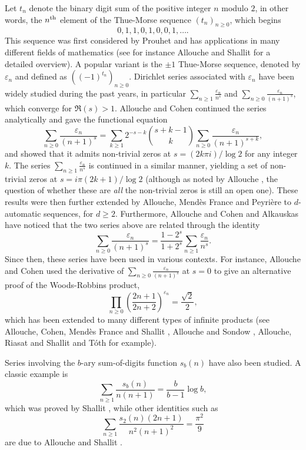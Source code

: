 \documentclass[12pt,reqno]{article}
\begin{document}
Let $t_n$ denote the binary digit sum of the positive integer $n$ modulo $2$, in other words, the $n^{\rm th}$ element of the Thue-Morse sequence $(t_n)_{n\geq0}$, which begins
$$
0,1,1,0,1,0,0,1,\ldots.
$$
This sequence was first considered by Prouhet \cite{Prouhet51} and has applications in many different fields of mathematics (see for instance Allouche and Shallit \cite{AlloucheShallit99} for a detailed overview). A popular variant is the $\pm1$ Thue-Morse sequence, denoted by $\varepsilon_n$ and defined as $((-1)^{t_n})_{n\geq0}$. Dirichlet series associated with $\varepsilon_n$ have been widely studied during the past years, in particular $\sum_{n\geq1} \frac{\varepsilon_n}{n^s}$ and $\sum_{n\geq0} \frac{\varepsilon_n}{(n+1)^s}$, which converge for $\Re(s)>1$. Allouche and Cohen \cite{AlloucheCohen85} continued the series analytically and gave the functional equation
$$
\sum_{n\geq0} \frac{\varepsilon_n}{(n+1)^s} = \sum_{k\geq1} 2^{-s-k} \binom{s+k-1}{k} \sum_{n\geq0} \frac{\varepsilon_n}{(n+1)^{s+k}},
$$
and showed that it admits non-trivial zeros at $s = (2k\pi i)/ \log2$ for any integer $k$. The series $\sum_{n\geq1} \frac{\varepsilon_n}{n^s}$ is continued in a similar manner, yielding a set of non-trivial zeros at $s = i\pi(2k+1)/ \log2$ (although as noted by Allouche \cite{Allouche15}, the question of whether these are \textit{all} the non-trivial zeros is still an open one). These results were then further extended by Allouche, Mend\`es France and Peyri\`ere \cite{Allouche00} to $d$-automatic sequences, for $d\geq2$. Furthermore, Allouche and Cohen \cite{AlloucheCohen85} and Alkauskas \cite{Alkauskas01} have noticed that the two series above are related through the identity
$$
\sum_{n\geq0} \frac{\varepsilon_n}{(n+1)^s} = \frac{1-2^s}{1+2^s} \sum_{n\geq1} \frac{\varepsilon_n}{n^s}.
$$
Since then, these series have been used in various contexts. For instance, Allouche and Cohen \cite{AlloucheCohen85} used the derivative of $\sum_{n\geq0} \frac{\varepsilon_n}{(n+1)^s}$ at $s=0$ to give an alternative proof of the Woods-Robbins product,
$$
\prod_{n\geq0} \left( \frac{2n+1}{2n+2} \right) ^{\varepsilon_n} = \frac{\sqrt2}{2},
$$
which has been extended to many different types of infinite products (see Allouche, Cohen, Mend\`es France and Shallit \cite{AlloucheShallit87}, Allouche and Sondow \cite{AlloucheSondow08}, Allouche, Riasat and Shallit \cite{Riasat19} and T\'oth \cite{Toth20} for example).

Series involving the $b$-ary sum-of-digits function $s_b(n)$ have also been studied. A classic example is
$$
\sum_{n\geq1} \frac{s_b(n)}{n(n+1)} = \frac{b}{b-1} \log b,
$$
which was proved by Shallit \cite{Shallit84}, while other identities such as
$$
\sum_{n\geq1} \frac{s_2(n) (2n+1)}{n^2(n+1)^2} = \frac{\pi^2}{9}
$$
are due to Allouche and Shallit \cite{AlloucheShallit90}.
\end{document}
